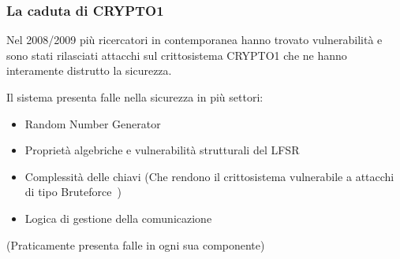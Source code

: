 \begin{frame}
    \frametitle{La caduta di CRYPTO1}
    Nel 2008/2009 più ricercatori in contemporanea hanno trovato vulnerabilità e sono stati rilasciati attacchi sul crittosistema CRYPTO1
    che ne hanno interamente distrutto la sicurezza.\cite{garcia2008dismantling}\cite{courtois2008algebraic}\cite{nohl2008reverse}\pause

    Il sistema presenta falle nella sicurezza in più settori:

    \begin{itemize}
        \item <2-> Random Number Generator
        \item <3-> Proprietà algebriche e vulnerabilità strutturali del LFSR
        \item <4-> Complessità delle chiavi (Che rendono il crittosistema vulnerabile a attacchi di tipo Bruteforce~\cite{courtois2008algebraic})
        \item <5-> Logica di gestione della comunicazione
    \end{itemize}

    (Praticamente presenta falle in ogni sua componente)
\end{frame}

